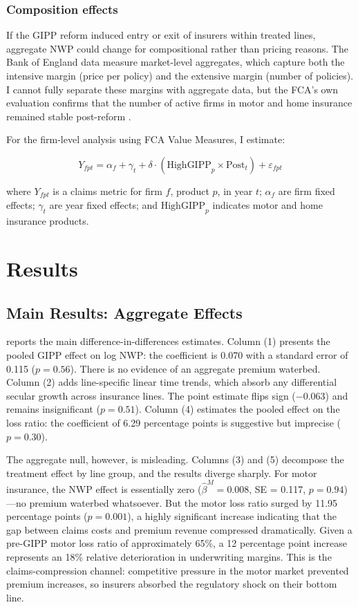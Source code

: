 \documentclass[12pt]{article}
\begin{document}
\subsubsection*{Composition effects} If the GIPP reform induced entry or exit of insurers within treated lines, aggregate NWP could change for compositional rather than pricing reasons. The Bank of England data measure market-level aggregates, which capture both the intensive margin (price per policy) and the extensive margin (number of policies). I cannot fully separate these margins with aggregate data, but the FCA's own evaluation confirms that the number of active firms in motor and home insurance remained stable post-reform \citep{FCA_EP25_2}.

For the firm-level analysis using FCA Value Measures, I estimate:

\begin{equation}
Y_{fpt} = \alpha_f + \gamma_t + \delta \cdot (\text{HighGIPP}_p \times \text{Post}_t) + \varepsilon_{fpt}
\label{eq:firm}
\end{equation}

\noindent where $Y_{fpt}$ is a claims metric for firm $f$, product $p$, in year $t$; $\alpha_f$ are firm fixed effects; $\gamma_t$ are year fixed effects; and $\text{HighGIPP}_p$ indicates motor and home insurance products.


\section{Results}
\label{sec:results}

\subsection{Main Results: Aggregate Effects}

 reports the main difference-in-differences estimates. Column (1) presents the pooled GIPP effect on log NWP: the coefficient is 0.070 with a standard error of 0.115 ($p = 0.56$). There is no evidence of an aggregate premium waterbed. Column (2) adds line-specific linear time trends, which absorb any differential secular growth across insurance lines. The point estimate flips sign ($-0.063$) and remains insignificant ($p = 0.51$). Column (4) estimates the pooled effect on the loss ratio: the coefficient of 6.29 percentage points is suggestive but imprecise ($p = 0.30$).

The aggregate null, however, is misleading. Columns (3) and (5) decompose the treatment effect by line group, and the results diverge sharply. For motor insurance, the NWP effect is essentially zero ($\hat{\beta}^M = 0.008$, SE = 0.117, $p = 0.94$)---no premium waterbed whatsoever. But the motor loss ratio surged by 11.95 percentage points ($p = 0.001$), a highly significant increase indicating that the gap between claims costs and premium revenue compressed dramatically. Given a pre-GIPP motor loss ratio of approximately 65\%, a 12 percentage point increase represents an 18\% relative deterioration in underwriting margins. This is the claims-compression channel: competitive pressure in the motor market prevented premium increases, so insurers absorbed the regulatory shock on their bottom line.
\end{document}
